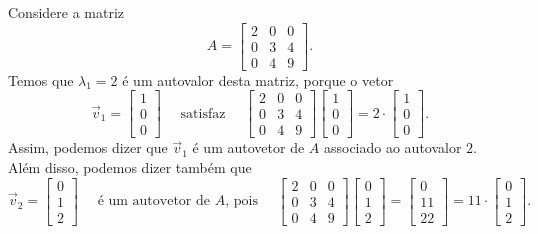 \begin{ex}
	Considere a matriz
	\begin{equation}
	A={\begin{bmatrix}2&0&0\\0&3&4\\0&4&9\end{bmatrix}}.
	\end{equation} Temos que $\lambda_1 = 2$ é um autovalor desta matriz, porque o vetor
	\begin{equation}
	\vec{v}_1 =
	{\begin{bmatrix}1\\0\\0\end{bmatrix}} \quad \text{ satisfaz } \quad {\begin{bmatrix}2&0&0\\0&3&4\\0&4&9\end{bmatrix}} {\begin{bmatrix}1\\0\\0\end{bmatrix}} = 2 \cdot {\begin{bmatrix}1\\0\\0\end{bmatrix}}.
	\end{equation} Assim, podemos dizer que $\vec{v}_1$ é um autovetor de $A$ associado ao autovalor $2$. Além disso, podemos dizer também que
	\begin{equation}
	\vec{v}_2 =
	{\begin{bmatrix}0\\1\\2\end{bmatrix}} \quad \text{ é um autovetor de $A$, pois } \quad {\begin{bmatrix}2&0&0\\0&3&4\\0&4&9\end{bmatrix}} {\begin{bmatrix}0\\1\\2\end{bmatrix}} = {\begin{bmatrix}0\\11\\22\end{bmatrix}} = 11 \cdot {\begin{bmatrix}0\\1\\2\end{bmatrix}}.

\end{equation}
\end{ex}
